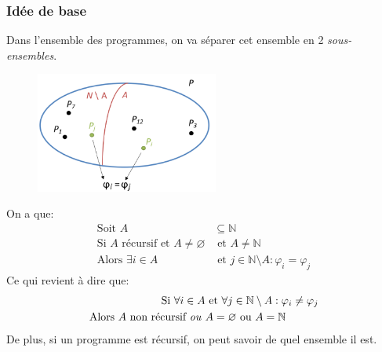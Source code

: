 \documentclass{report}
\begin{document}
\subsubsection{Idée de base}
Dans l'ensemble des programmes, on va séparer cet ensemble en 2 \textit{sous-ensembles}.
\begin{figure}[H]
\centering
\includegraphics[width=6cm]{img/rice.png}
\end{figure}
On a que:
\begin{align*}
\text{Soit } A &\subseteq \mathbb{N}\\
\text{Si } A \text{ récursif et } A \neq \varnothing &\text{ et } A \neq \mathbb{N}\\
\text{Alors } \exists i \in A &\text{ et } j \in \mathbb{N} \setminus A : \varphi_i = \varphi_j 
\end{align*}
Ce qui revient à dire que:
\begin{align*}
\text{Si } \forall i \in A &\text{ et } \forall j \in \mathbb{N} \setminus A: \varphi_i \neq \varphi_j\\
\text{Alors } A \text{ non récursif \textit{ou} } &A = \varnothing \text{ ou } A = \mathbb{N}
\end{align*}
De plus, si un programme est récursif, on peut savoir de quel ensemble il est.
\end{document}
